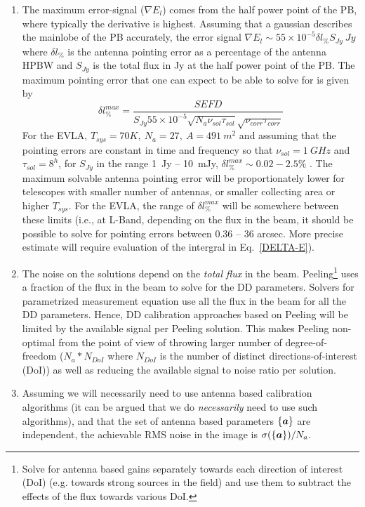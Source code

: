 \documentclass[11pt]{article}
\def\vec#1{\ensuremath{\mathchoice{\mbox{\boldmath$\displaystyle#1$}}
{\mbox{\boldmath$\textstyle#1$}}
{\mbox{\boldmath$\scriptstyle#1$}}
{\mbox{\boldmath$\scriptscriptstyle#1$}}}}
\begin{document}
\begin{enumerate}
\item The maximum error-signal ($\nabla E_l$) comes from the half
  power point of the PB, where typically the derivative is highest.
  Assuming that a gaussian describes the mainlobe of the PB
  accurately, the error signal $\nabla E_l \sim 55\times 10^{-5} \delta l_{\%}
  S_{Jy} ~Jy$ where $\delta l_\%$ is the antenna pointing error as
  a percentage of the antenna HPBW and $S_{Jy}$ is the total flux in
  Jy at the half power point of the PB.  The maximum pointing error
  that one can expect to be able to solve for is given by 
\begin{equation}
  \delta l^{max}_\% = \frac{SEFD}{S_{Jy} 55\times 10^{-5}\sqrt{N_a \nu_{sol} \tau_{sol}}\sqrt{\nu_{corr}\tau_{corr}}}
\end{equation}
For the EVLA, $T_{sys} = 70K,~N_a=27,~A=491~m^2$ and assuming that the
pointing errors are constant in time and frequency so that
$\nu_{sol}=1~GHz$ and $\tau_{sol} = 8^h$, for $S_{Jy}$ in the range
1~Jy -- 10~mJy, $\delta l^{max}_\% \sim 0.02 - 2.5\%$ .  The maximum
solvable antenna pointing error will be proportionately lower for
telescopes with smaller number of antennas, or smaller collecting area
or higher $T_{sys}$.  For the EVLA, the range of $\delta l^{max}_\%$
will be somewhere between these limits (i.e., at L-Band, depending on
the flux in the beam, it should be possible to solve for pointing
errors between 0.36 -- 36 arcsec.  More precise estimate will require
evaluation of the intergral in Eq.~\ref{DELTA-E}).


\item The noise on the solutions depend on the {\it total flux} in the
  beam.  Peeling\footnote{Solve for antenna based gains separately
    towards each direction of interest (DoI) (e.g. towards strong
    sources in the field) and use them to subtract the effects of the
    flux towards various DoI.} uses a fraction of the flux in the beam
  to solve for the DD parameters.  Solvers for parametrized
  measurement equation use all the flux in the beam for all the DD
  parameters.  Hence, DD calibration approaches based on Peeling will
  be limited by the available signal per Peeling solution.  This makes
  Peeling non-optimal from the point of view of throwing larger number
  of degree-of-freedom ($N_a*N_{DoI}$ where $N_{DoI}$ is the number of
  distinct directions-of-interest (DoI)) as well as reducing the
  available signal to noise ratio per solution.

\item Assuming we will necessarily need to use antenna based
  calibration algorithms (it can be argued that we do {\it
    necessarily} need to use such algorithms), and that the set of
  antenna based parameters $\{\vec{a}\}$ are independent, the
  achievable RMS noise in the image is
  $\sigma(\{\vec{a}\})/N_a$.

\end{enumerate}
\end{document}
